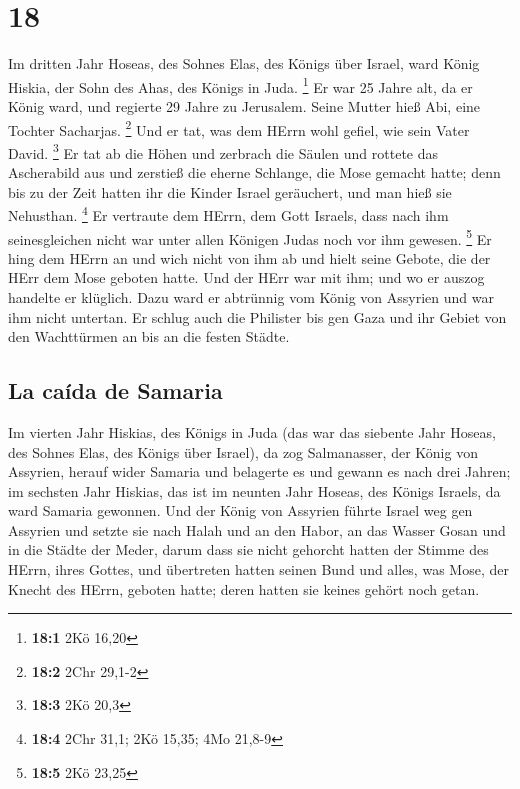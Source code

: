 \hypertarget{section-17}{%
\section{18}\label{section-17}}

 Im dritten Jahr Hoseas, des Sohnes Elas, des Königs über
Israel, ward König Hiskia, der Sohn des Ahas, des Königs in Juda.
\footnote{\textbf{18:1} 2Kö 16,20}  Er war 25 Jahre alt,
da er König ward, und regierte 29 Jahre zu Jerusalem. Seine Mutter hieß
Abi, eine Tochter Sacharjas. \footnote{\textbf{18:2} 2Chr 29,1-2}
 Und er tat, was dem HErrn wohl gefiel, wie sein Vater
David. \footnote{\textbf{18:3} 2Kö 20,3}  Er tat ab die
Höhen und zerbrach die Säulen und rottete das Ascherabild aus und
zerstieß die eherne Schlange, die Mose gemacht hatte; denn bis zu der
Zeit hatten ihr die Kinder Israel geräuchert, und man hieß sie
Nehusthan. \footnote{\textbf{18:4} 2Chr 31,1; 2Kö 15,35; 4Mo 21,8-9}
 Er vertraute dem HErrn, dem Gott Israels, dass nach ihm
seinesgleichen nicht war unter allen Königen Judas noch vor ihm gewesen.
\footnote{\textbf{18:5} 2Kö 23,25}  Er hing dem HErrn an
und wich nicht von ihm ab und hielt seine Gebote, die der HErr dem Mose
geboten hatte.  Und der HErr war mit ihm; und wo er auszog
handelte er klüglich. Dazu ward er abtrünnig vom König von Assyrien und
war ihm nicht untertan.  Er schlug auch die Philister bis
gen Gaza und ihr Gebiet von den Wachttürmen an bis an die festen Städte.

\hypertarget{la-cauxedda-de-samaria}{%
\subsection{La caída de Samaria}\label{la-cauxedda-de-samaria}}

 Im vierten Jahr Hiskias, des Königs in Juda (das war das
siebente Jahr Hoseas, des Sohnes Elas, des Königs über Israel), da zog
Salmanasser, der König von Assyrien, herauf wider Samaria und belagerte
es  und gewann es nach drei Jahren; im sechsten Jahr
Hiskias, das ist im neunten Jahr Hoseas, des Königs Israels, da ward
Samaria gewonnen.  Und der König von Assyrien führte
Israel weg gen Assyrien und setzte sie nach Halah und an den Habor, an
das Wasser Gosan und in die Städte der Meder,  darum dass
sie nicht gehorcht hatten der Stimme des HErrn, ihres Gottes, und
übertreten hatten seinen Bund und alles, was Mose, der Knecht des HErrn,
geboten hatte; deren hatten sie keines gehört noch getan.

